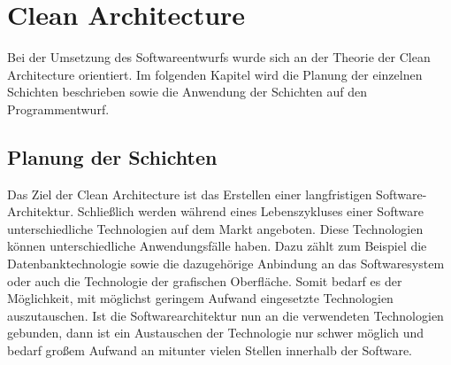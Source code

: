 \chapter{Clean Architecture}
Bei der Umsetzung des Softwareentwurfs wurde sich an der Theorie der Clean Architecture orientiert.
Im folgenden Kapitel wird die Planung der einzelnen Schichten beschrieben sowie die Anwendung der Schichten auf den Programmentwurf.

\section{Planung der Schichten}
Das Ziel der Clean Architecture ist das Erstellen einer langfristigen Software-Architektur.
Schließlich werden während eines Lebenszykluses einer Software unterschiedliche Technologien auf dem Markt angeboten.
Diese Technologien können unterschiedliche Anwendungsfälle haben.
Dazu zählt zum Beispiel die Datenbanktechnologie sowie die dazugehörige Anbindung an das Softwaresystem oder auch die Technologie der grafischen Oberfläche.
Somit bedarf es der Möglichkeit, mit möglichst geringem Aufwand eingesetzte Technologien auszutauschen.
Ist die Softwarearchitektur nun an die verwendeten Technologien gebunden, dann ist ein Austauschen der Technologie nur schwer möglich und bedarf großem Aufwand an mitunter vielen Stellen innerhalb der Software.

